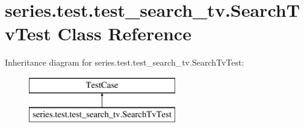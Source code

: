 \hypertarget{classseries_1_1test_1_1test__search__tv_1_1_search_tv_test}{}\section{series.\+test.\+test\+\_\+search\+\_\+tv.\+Search\+Tv\+Test Class Reference}
\label{classseries_1_1test_1_1test__search__tv_1_1_search_tv_test}
Inheritance diagram for series.\+test.\+test\+\_\+search\+\_\+tv.\+Search\+Tv\+Test\+:\begin{figure}[H]
\begin{center}
\leavevmode
\includegraphics[height=2.000000cm]{classseries_1_1test_1_1test__search__tv_1_1_search_tv_test}
\end{center}
\end{figure}
